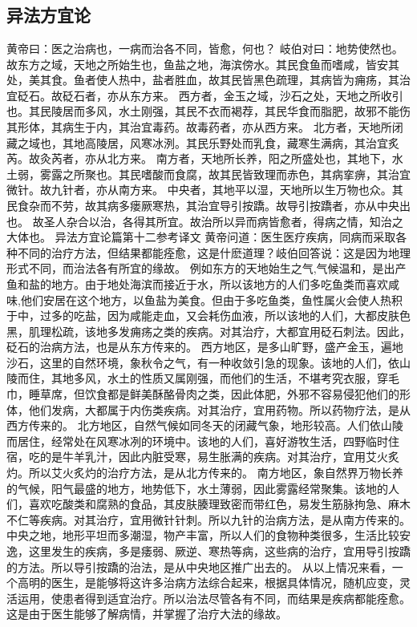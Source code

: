 \documentclass[a4paper,12pt,UTF8,twoside]{ctexbook}
\begin{document}
\part{}
\chapter{异法方宜论}

黄帝曰：医之治病也，一病而治各不同，皆愈，何也？
岐伯对曰：地势使然也。故东方之域，天地之所始生也，鱼盐之地，海滨傍水。其民食鱼而嗜咸，皆安其处，美其食。鱼者使人热中，盐者胜血，故其民皆黑色疏理，其病皆为痈疡，其治宜砭石。故砭石者，亦从东方来。
西方者，金玉之域，沙石之处，天地之所收引也。其民陵居而多风，水土刚强，其民不衣而褐荐，其民华食而脂肥，故邪不能伤其形体，其病生于内，其治宜毒药。故毒药者，亦从西方来。
北方者，天地所闭藏之域也，其地高陵居，风寒冰洌。其民乐野处而乳食，藏寒生满病，其治宜炙芮。故灸芮者，亦从北方来。
南方者，天地所长养，阳之所盛处也，其地下，水土弱，雾露之所聚也。其民嗜酸而食腐，故其民皆致理而赤色，其病挛痹，其治宜微针。故九针者，亦从南方来。
中央者，其地平以湿，天地所以生万物也众。其民食杂而不劳，故其病多瘘厥寒热，其治宜导引按蹻。故导引按蹻者，亦从中央出也。
故圣人杂合以治，各得其所宜。故治所以异而病皆愈者，得病之情，知治之大体也。
异法方宜论篇第十二参考译文
黄帝问道：医生医疗疾病，同病而采取各种不同的治疗方法，但结果都能痊愈，这是什麽道理？岐伯回答说：这是因为地理形式不同，而治法各有所宜的缘故。
例如东方的天地始生之气,气候温和，是出产鱼和盐的地方。由于地处海滨而接近于水，所以该地方的人们多吃鱼类而喜欢咸味,他们安居在这个地方，以鱼盐为美食。但由于多吃鱼类，鱼性属火会使人热积于中，过多的吃盐，因为咸能走血，又会耗伤血液，所以该地的人们，大都皮肤色黑，肌理松疏，该地多发痈疡之类的疾病。对其治疗，大都宜用砭石刺法。因此，砭石的治病方法，也是从东方传来的。
西方地区，是多山旷野，盛产金玉，遍地沙石，这里的自然环境，象秋令之气，有一种收敛引急的现象。该地的人们，依山陵而住，其地多风，水土的性质又属刚强，而他们的生活，不堪考究衣服，穿毛巾，睡草席，但饮食都是鲜美酥酪骨肉之类，因此体肥，外邪不容易侵犯他们的形体，他们发病，大都属于内伤类疾病。对其治疗，宜用药物。所以药物疗法，是从西方传来的。
北方地区，自然气候如同冬天的闭藏气象，地形较高。人们依山陵而居住，经常处在风寒冰冽的环境中。该地的人们，喜好游牧生活，四野临时住宿，吃的是牛羊乳汁，因此内脏受寒，易生胀满的疾病。对其治疗，宜用艾火炙灼。所以艾火炙灼的治疗方法，是从北方传来的。
南方地区，象自然界万物长养的气候，阳气最盛的地方，地势低下，水土薄弱，因此雾露经常聚集。该地的人们，喜欢吃酸类和腐熟的食品，其皮肤腠理致密而带红色，易发生筋脉拘急、麻木不仁等疾病。对其治疗，宜用微针针刺。所以九针的治病方法，是从南方传来的。
中央之地，地形平坦而多潮湿，物产丰富，所以人们的食物种类很多，生活比较安逸，这里发生的疾病，多是痿弱、厥逆、寒热等病，这些病的治疗，宜用导引按蹻的方法。所以导引按蹻的治法，是从中央地区推广出去的。
从以上情况来看，一个高明的医生，是能够将这许多治病方法综合起来，根据具体情况，随机应变，灵活运用，使患者得到适宜治疗。所以治法尽管各有不同，而结果是疾病都能痊愈。这是由于医生能够了解病情，并掌握了治疗大法的缘故。
\end{document}
